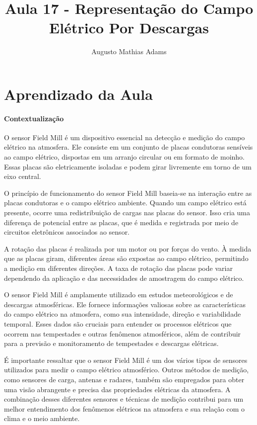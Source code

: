 \documentclass[a4paper, 12pt, onecolumn,singlespacing]{article}
\title{Aula 17 - Representação do Campo Elétrico Por Descargas}
\author[1]{Augusto Mathias Adams}
\affil[1]{augusto.adams@ufpr.br}
\begin{document}
	
	\maketitle
	
	\section{Aprendizado da Aula}
	
	\paragraph{Contextualização}
		O sensor Field Mill é um dispositivo essencial na detecção e medição do campo elétrico na atmosfera. Ele consiste em um conjunto de placas condutoras sensíveis ao campo elétrico, dispostas em um arranjo circular ou em formato de moinho. Essas placas são eletricamente isoladas e podem girar livremente em torno de um eixo central.
		
		O princípio de funcionamento do sensor Field Mill baseia-se na interação entre as placas condutoras e o campo elétrico ambiente. Quando um campo elétrico está presente, ocorre uma redistribuição de cargas nas placas do sensor. Isso cria uma diferença de potencial entre as placas, que é medida e registrada por meio de circuitos eletrônicos associados ao sensor.
		
		A rotação das placas é realizada por um motor ou por forças do vento. À medida que as placas giram, diferentes áreas são expostas ao campo elétrico, permitindo a medição em diferentes direções. A taxa de rotação das placas pode variar dependendo da aplicação e das necessidades de amostragem do campo elétrico.
		
		O sensor Field Mill é amplamente utilizado em estudos meteorológicos e de descargas atmosféricas. Ele fornece informações valiosas sobre as características do campo elétrico na atmosfera, como sua intensidade, direção e variabilidade temporal. Esses dados são cruciais para entender os processos elétricos que ocorrem nas tempestades e outras fenômenos atmosféricos, além de contribuir para a previsão e monitoramento de tempestades e descargas elétricas.
		
		É importante ressaltar que o sensor Field Mill é um dos vários tipos de sensores utilizados para medir o campo elétrico atmosférico. Outros métodos de medição, como sensores de carga, antenas e radares, também são empregados para obter uma visão abrangente e precisa das propriedades elétricas da atmosfera. A combinação desses diferentes sensores e técnicas de medição contribui para um melhor entendimento dos fenômenos elétricos na atmosfera e sua relação com o clima e o meio ambiente.
		
\end{document}
